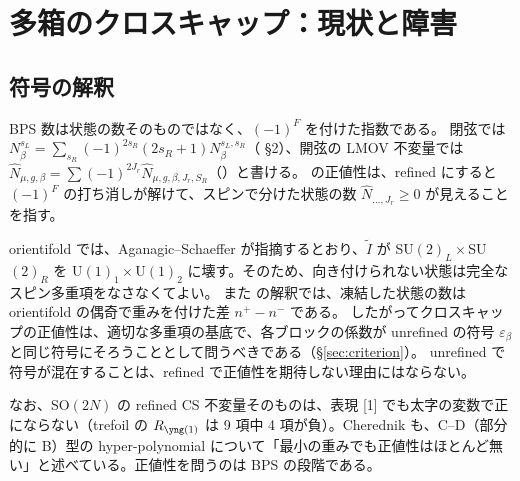 \section{多箱のクロスキャップ：現状と障害}\label{sec:positivity}

\subsection{符号の解釈}
BPS 数は状態の数そのものではなく、$(-1)^F$ を付けた指数である。
閉弦では $N^{s_L}_\beta = \sum_{s_R}(-1)^{2s_R}(2s_R + 1)N^{s_L,s_R}_\beta$（\cite{AgSc12} §2）、開弦の LMOV 不変量では $\hat N_{\mu,g,\beta} = \sum(-1)^{2J_r}\hat N_{\mu,g,\beta,J_r,S_R}$（\cite{KN17}）と書ける。
\cite{KN17} の正値性は、refined にすると $(-1)^F$ の打ち消しが解けて、スピンで分けた状態の数 $\hat N_{\dots,J_r} \ge 0$ が見えることを指す。

orientifold では、Aganagic--Schaeffer \cite{AgSc12} が指摘するとおり、$\tilde I$ が SU$(2)_L\times$SU$(2)_R$ を U$(1)_1\times$U$(1)_2$ に壊す。そのため、向き付けられない状態は完全なスピン多重項をなさなくてよい。
また \cite{PU14} の解釈では、凍結した状態の数は orientifold の偶奇で重みを付けた差 $n^+ - n^-$ である。
したがってクロスキャップの正値性は、適切な多重項の基底で、各ブロックの係数が unrefined の符号 $\varepsilon_\beta$ と同じ符号にそろうこととして問うべきである（§\ref{sec:criterion}）。
unrefined で符号が混在することは、refined で正値性を期待しない理由にはならない。

なお、SO$(2N)$ の refined CS 不変量そのものは、表現 [1] でも太字の変数で正にならない（trefoil の $R_{\yone}$ は 9 項中 4 項が負）。Cherednik \cite{Cherednik11} も、C--D（部分的に B）型の hyper-polynomial について「最小の重みでも正値性はほとんど無い」と述べている。正値性を問うのは BPS の段階である。

